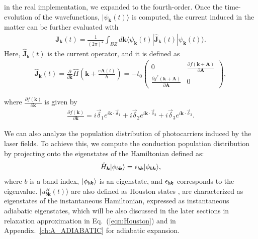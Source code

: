 in the real implementation, we expanded to the fourth-order.
Once the time-evolution of the wavefunctions, $|\psi_{\mathbf k}(t)\rangle$ is computed, the current induced in the matter can be further evaluated with
\begin{align}
	\mathbf{J}_{\mathbf k}(t)=\frac{1}{(2\pi)^2} \int_{BZ} d\mathbf k\langle \psi_{\mathbf k}(t)|\hat{\mathbf J}_{\mathbf k}(t)| \psi_{\mathbf{k}}(t)\rangle.
	\label{eq:current}
\end{align}
Here, $\hat {\mathbf J}_{\mathbf k}(t)$ is the current operator, and it is defined as
\begin{align}
	\hat {\mathbf J}_{\mathbf k}(t) = \frac{\partial }{\partial \mathbf k}\hat H \left (\mathbf k + \frac{e\mathbf A(t)}{\hbar} \right ) =
	-t_0 \left(\begin{array}{cc}
			           0                                                              & \frac{\partial f(\mathbf{k}+\mathbf{A})}{\partial \mathbf A} \\
			           \frac{\partial f^*(\mathbf{k}+\mathbf{A})}{\partial \mathbf A} & 0
		           \end{array}\right),
\end{align}

where $\frac{\partial f(\mathbf k)}{\partial \mathbf k}$ is given by
\begin{align}
	\frac{\partial f(\mathbf k)}{\partial \mathbf k}=i \overrightarrow{\delta}_1e^{i\mathbf k \cdot \overrightarrow\delta_1}
	+i \overrightarrow{\delta}_2e^{i\mathbf k \cdot \vec \delta_2}
	+i \overrightarrow{\delta}_3e^{i\mathbf k \cdot \overrightarrow\delta_3}.
\end{align}

We can also analyze the population distribution of photocarriers induced by the laser fields. To achieve this, we compute the conduction population distribution by projecting onto the eigenstates of the Hamiltonian defined as:
\begin{align}
	\hat{H}_{\boldsymbol{k}}|\phi_{b \boldsymbol{k}}\rangle = \epsilon_{b\boldsymbol{k}}|\phi_{b \boldsymbol{k}}\rangle,
	\label{eq:eigenstates-h0}
\end{align}
where $b$ is a band index, $|\phi_{b \boldsymbol{k}}\rangle$ is an eigenstate, and $\epsilon_{b\boldsymbol{k}}$ corresponds to the eigenvalue.
$|u^H_{b\mathbf k}(t)\rangle $ are also defined as Houston states \cite{PhysRev.57.184, PhysRevB.33.5494}, are characterized as eigenstates of the instantaneous Hamiltonian, expressed as instantaneous adiabatic eigenstates, which will be also discussed in the later sections in relaxation approximation in Eq.~(\ref{eqn:Houston}) and in Appendix.~\ref{ch:A_ADIABATIC} for adiabatic expansion.

